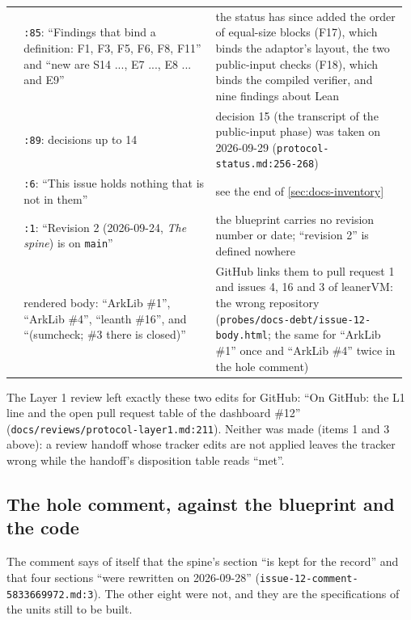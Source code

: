 {\begin{longtable}{@{}>{\raggedright\arraybackslash}p{0.029\linewidth}>{\raggedright\arraybackslash}p{0.470\linewidth}>{\raggedright\arraybackslash}p{0.470\linewidth}@{}}
7 & \texttt{:\allowbreak{}85}: ``Findings that bind a definition: F1, F3, F5, F6, F8, F11'' and ``new are S14 ..., E7 ..., E8 ... and E9'' & the status has since added the order of equal-size blocks (F17), which binds the adaptor's layout, the two public-input checks (F18), which binds the compiled verifier, and nine findings about Lean \\\addlinespace[2pt]
8 & \texttt{:\allowbreak{}89}: decisions up to 14 & decision 15 (the transcript of the public-input phase) was taken on 2026-09-29 (\texttt{protocol-\allowbreak{}status.\allowbreak{}md:\allowbreak{}256-\allowbreak{}268}) \\\addlinespace[2pt]
9 & \texttt{:\allowbreak{}6}: ``This issue holds nothing that is not in them'' & see the end of \cref{sec:docs-inventory} \\\addlinespace[2pt]
10 & \texttt{:\allowbreak{}1}: ``Revision 2 (2026-09-24, \emph{The spine}) is on \texttt{main}'' & the blueprint carries no revision number or date; ``revision 2'' is defined nowhere \\\addlinespace[2pt]
11 & rendered body: ``ArkLib \#1'', ``ArkLib \#4'', ``leanth \#16'', and ``(sumcheck; \#3 there is closed)'' & GitHub links them to pull request 1 and issues 4, 16 and 3 of leanerVM: the wrong repository (\texttt{probes/\allowbreak{}docs-\allowbreak{}debt/\allowbreak{}issue-\allowbreak{}12-\allowbreak{}body.\allowbreak{}html}; the same for ``ArkLib \#1'' once and ``ArkLib \#4'' twice in the hole comment) \\
\end{longtable}}

\begin{sloppypar}
The Layer 1 review left exactly these two edits for GitHub: ``On GitHub: the L1 line and the open pull request table of the dashboard \#12'' (\texttt{docs/\allowbreak{}reviews/\allowbreak{}protocol-\allowbreak{}layer1.\allowbreak{}md:\allowbreak{}211}). Neither was made (items 1 and 3 above): a review handoff whose tracker edits are not applied leaves the tracker wrong while the handoff's disposition table reads ``met''.
\end{sloppypar}

\subsection{The hole comment, against the blueprint and the code}\label{sec:docs-hole-comment}

\begin{sloppypar}
The comment says of itself that the spine's section ``is kept for the record'' and that four sections ``were rewritten on 2026-09-28'' (\texttt{issue-\allowbreak{}12-\allowbreak{}comment-\allowbreak{}5833669972.\allowbreak{}md:\allowbreak{}3}). The other eight were not, and they are the specifications of the units still to be built.
\end{sloppypar}

